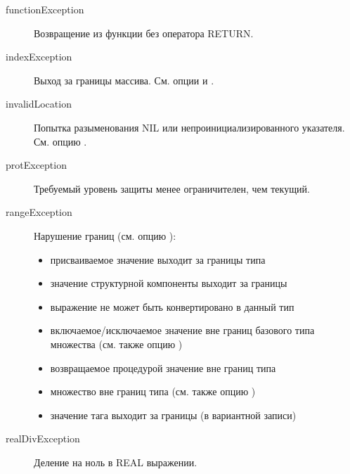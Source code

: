 \begin{description}
\begin{itemize}
        \end{itemize}

\item[functionException] \mbox{}

Возвращение из функции без оператора RETURN.

\item[indexException] \mbox{}

Выход за границы массива. См. опции
 и .

\item[invalidLocation] \mbox{}

Попытка разыменования NIL или непроинициализированного указателя.
См. опцию .

\item[protException] \mbox{}

Требуемый уровень защиты менее ограничителен, чем текущий.

\item[rangeException] \mbox{}

        Нарушение границ (см. опцию ):
        \begin{itemize}
        \item присваиваемое значение выходит за границы типа
        \item значение структурной компоненты выходит за границы
        \item выражение не может быть конвертировано в данный тип
        \item включаемое/исключаемое значение вне границ базового
типа множества (см. также опцию  )
        \item возвращаемое процедурой значение вне границ типа
        \item множество вне границ типа
              (см. также опцию )
        \item значение тага выходит за границы (в вариантной записи)
        \end{itemize}

\item[realDivException] \mbox{}

Деление на ноль в REAL выражении.


\end{description}
